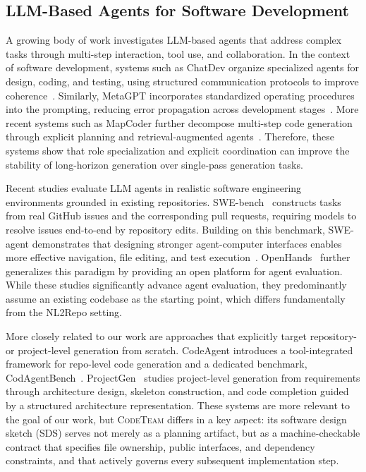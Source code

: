 \documentclass[format=acmsmall, review=false, screen=true]{acmart}
\newcommand{\tool}{\textsc{CodeTeam}\xspace}
\begin{document}
\subsection{LLM-Based Agents for Software Development}
A growing body of work investigates LLM-based agents that address complex tasks through multi-step interaction, tool use, and collaboration. In the context of software development, systems such as ChatDev organize specialized agents for design, coding, and testing, using structured communication protocols to improve coherence~\cite{Qian2023ChatDev}. Similarly, MetaGPT incorporates standardized operating procedures into the prompting, reducing error propagation across development stages~\cite{Hong2023MetaGPT}. More recent systems such as MapCoder further decompose multi-step code generation through explicit planning and retrieval-augmented agents~\cite{Islam2024MapCoder}. Therefore, these systems show that role specialization and explicit coordination can improve the stability of long-horizon generation over single-pass generation tasks.

Recent studies evaluate LLM agents in realistic software engineering environments grounded in existing repositories. SWE-bench~\cite{Jimenez2023SWEBench} constructs tasks from real GitHub issues and the corresponding pull requests, requiring models to resolve issues end-to-end by repository edits. Building on this benchmark, SWE-agent demonstrates that designing stronger agent-computer interfaces enables more effective navigation, file editing, and test execution~\cite{Yang2024SWEagent}. OpenHands~\cite{Wang2024OpenDevin} further generalizes this paradigm by providing an open platform for agent evaluation. While these studies significantly advance agent evaluation, they predominantly assume an existing codebase as the starting point, which differs fundamentally from the NL2Repo setting.

More closely related to our work are approaches that explicitly target repository- or project-level generation from scratch. CodeAgent introduces a tool-integrated framework for repo-level code generation and a dedicated benchmark, CodAgentBench~\cite{Zhang2024CodeAgent}. ProjectGen~\cite{Zhao2025ProjectGen} studies project-level generation from requirements through architecture design, skeleton construction, and code completion guided by a structured architecture representation. These systems are more relevant to the goal of our work, but \tool differs in a key aspect: its software design sketch (SDS) serves not merely as a planning artifact, but as a machine-checkable contract that specifies file ownership, public interfaces, and dependency constraints, and that actively governs every subsequent implementation step.
\end{document}
